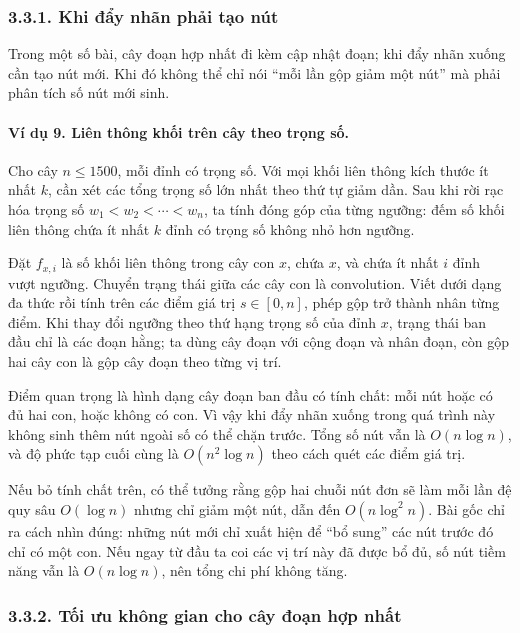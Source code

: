 \documentclass[11pt]{article}
\begin{document}
\subsubsection*{3.3.1. Khi đẩy nhãn phải tạo nút}

Trong một số bài, cây đoạn hợp nhất đi kèm cập nhật đoạn; khi đẩy nhãn xuống
cần tạo nút mới. Khi đó không thể chỉ nói ``mỗi lần gộp giảm một nút'' mà phải
phân tích số nút mới sinh.

\paragraph{Ví dụ 9. Liên thông khối trên cây theo trọng số.}
Cho cây \(n\le 1500\), mỗi đỉnh có trọng số. Với mọi khối liên thông kích thước
ít nhất \(k\), cần xét các tổng trọng số lớn nhất theo thứ tự giảm dần. Sau khi
rời rạc hóa trọng số \(w_1<w_2<\cdots<w_n\), ta tính đóng góp của từng ngưỡng:
đếm số khối liên thông chứa ít nhất \(k\) đỉnh có trọng số không nhỏ hơn
ngưỡng.

Đặt \(f_{x,i}\) là số khối liên thông trong cây con \(x\), chứa \(x\), và chứa
ít nhất \(i\) đỉnh vượt ngưỡng. Chuyển trạng thái giữa các cây con là convolution.
Viết dưới dạng đa thức rồi tính trên các điểm giá trị \(s\in[0,n]\), phép gộp
trở thành nhân từng điểm. Khi thay đổi ngưỡng theo thứ hạng trọng số của đỉnh
\(x\), trạng thái ban đầu chỉ là các đoạn hằng; ta dùng cây đoạn với cộng đoạn
và nhân đoạn, còn gộp hai cây con là gộp cây đoạn theo từng vị trí.

Điểm quan trọng là hình dạng cây đoạn ban đầu có tính chất: mỗi nút hoặc có đủ
hai con, hoặc không có con. Vì vậy khi đẩy nhãn xuống trong quá trình này không
sinh thêm nút ngoài số có thể chặn trước. Tổng số nút vẫn là \(O(n\log n)\), và
độ phức tạp cuối cùng là \(O(n^2\log n)\) theo cách quét các điểm giá trị.

Nếu bỏ tính chất trên, có thể tưởng rằng gộp hai chuỗi nút đơn sẽ làm mỗi lần
đệ quy sâu \(O(\log n)\) nhưng chỉ giảm một nút, dẫn đến \(O(n\log^2 n)\). Bài
gốc chỉ ra cách nhìn đúng: những nút mới chỉ xuất hiện để ``bổ sung'' các nút
trước đó chỉ có một con. Nếu ngay từ đầu ta coi các vị trí này đã được bổ đủ,
số nút tiềm năng vẫn là \(O(n\log n)\), nên tổng chi phí không tăng.


\subsubsection*{3.3.2. Tối ưu không gian cho cây đoạn hợp nhất}
\end{document}
